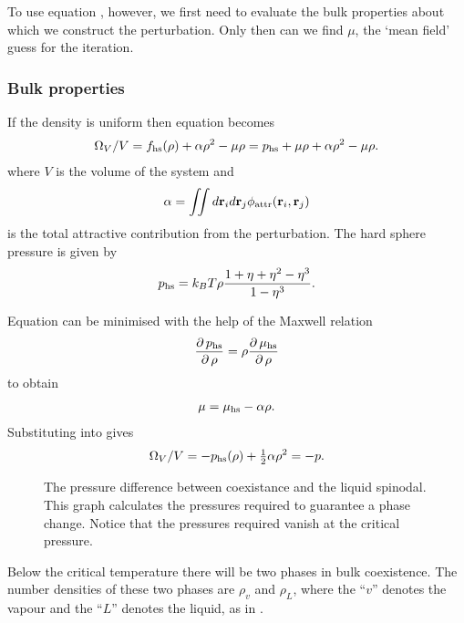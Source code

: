 To use equation , however, 
we first need to evaluate the bulk properties about which we construct the perturbation.
Only then can we find $\mu$, the `mean field' guess for the iteration. %

\subsubsection{Bulk properties}
If the density is uniform then equation  becomes
\begin{align}
   \Omega_V/V =  f_{\text{hs}}(\rho)  +   \alpha \rho^2 -  \mu \rho= p_{\text{hs}} + \mu \rho +   \alpha \rho^2 -  \mu \rho. \label{eqn:OmegaVBulk}
\end{align}
where $V$ is the volume of the system and 
\begin{align}
  \alpha =  \iint d \textbf{r}_i d\textbf{r}_j \phi_{\text{attr}}( \textbf{r}_i, \textbf{r}_j)
\end{align}
is the total attractive contribution from the perturbation.
The hard sphere pressure is given by
\begin{align}
 p_{\text{hs}} = k_B T \rho \frac{1+\eta +\eta^2-\eta^3}{1-\eta^3}. \label{eqn:HSpressure}
\end{align}

Equation   can be minimised with the help of the Maxwell relation
\begin{align}
  \frac{\operatorname{\partial} p_{\text{hs}}}{\operatorname{\partial} \rho} = \rho \frac{\operatorname{\partial} \mu_{\text{hs}}}{\operatorname{\partial} \rho} 
\end{align}
to obtain
\begin{align}
  \mu = \mu_{\text{hs}} - \alpha \rho. \label{eqn:muBulk}
\end{align}
Substituting  into  gives
\begin{align}
   \Omega_V/V = -p_{\text{hs}}(\rho) + \tfrac{1}{2} \alpha \rho^2 = -p.
\end{align}

\begin{figure}
  
  \caption{ 
    The pressure difference between coexistance and the liquid spinodal.
This graph calculates  the pressures required to guarantee a phase change.
Notice that the pressures required vanish at the critical pressure.
  }
 \label{fig:sppressure}
\end{figure}

Below the critical temperature there will be 
two phases in  bulk coexistence.
The number densities of these two phases are $\rho_v$ and $\rho_L$,
where the ``$v$'' denotes the vapour and the ``$L$'' denotes the liquid,
as in .

